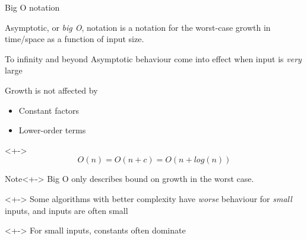 \documentclass[pdf]{beamer}
\begin{document}
\begin{frame}{Big O notation}
    \begin{definition}
        Asymptotic, or \emph{big O}, notation is a notation for the worst-case
        \alert{growth} in time/space as a \alert{function of input size}.
    \end{definition}
\end{frame}

\begin{frame}{To infinity and beyond}
    Asymptotic behaviour come into effect when input is \emph{very} large

    \begin{block}{Growth is not affected by}
        \begin{itemize}[<+>]
            \item Constant factors
            \item Lower-order terms
        \end{itemize}
    \end{block}

    \begin{block}{}<+->
        \begin{equation*}
            O(n) = O(n + c) = O(n + log(n))
        \end{equation*}
    \end{block}
\end{frame}

\begin{frame}
    \begin{block}{Note}<+->
        Big O only describes bound on \alert{growth} in the \alert{worst case}.
    \end{block}

    \begin{block}{}<+->
        Some algorithms with better complexity have \emph{worse} behaviour for
        \emph{small} inputs, and inputs are often small
    \end{block}

    \begin{block}{}<+->
        For small inputs, constants often dominate
    \end{block}
\end{frame}

\newcommand{\Ologn}     {$O(log(n))$}
\newcommand{\On}        {$O(n)$}
\newcommand{\Onlogn}    {$O(n \cdot log(n))$}
\newcommand{\Oexp}[1]   {$O(n^{#1})$}

\newcommand{\usec}[1]{\si{\num{#1}\us}}
\newcommand{\msec}[1]{\si{\num{#1}\ms}}
\newcommand{\Sec} [1]{\si{\num{#1}\s}}
\newcommand{\Min} [1]{\si{\num{#1}\min}}
\newcommand{\Hr}  [1]{\si{\num{#1}\hour}}
\newcommand{\Day} [1]{\si{\num{#1}\day}}
\end{document}
